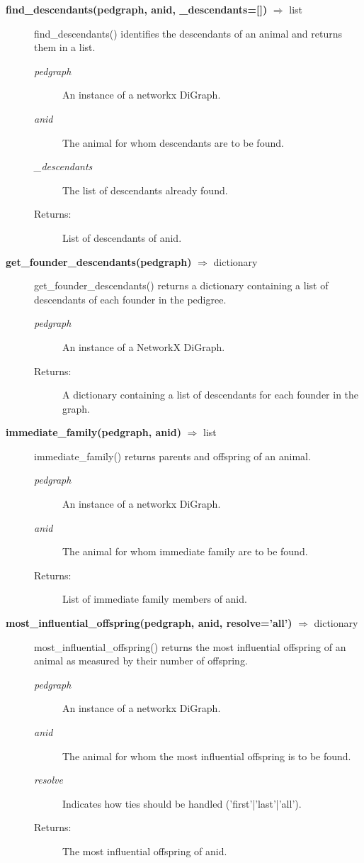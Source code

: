 \begin{description}
\item[\textbf{find\_descendants(pedgraph, anid, \_descendants=[])} $\Rightarrow$ list]
find\_descendants() identifies the descendants of an animal and returns them in a list.
\begin{description}
\item[\emph{pedgraph}] An instance of a networkx DiGraph.
\item[\emph{anid}] The animal for whom descendants are to be found.
\item[\emph{\_descendants}] The list of descendants already found.
\item[Returns:] List of descendants of anid.
\end{description}

\item[\textbf{get\_founder\_descendants(pedgraph)} $\Rightarrow$ dictionary]
get\_founder\_descendants() returns a dictionary containing a list of descendants of each founder in the pedigree.
\begin{description}
\item[\emph{pedgraph}] An instance of a NetworkX DiGraph.
\item[Returns:] A dictionary containing a list of descendants for each founder in the graph.
\end{description}

\item[\textbf{immediate\_family(pedgraph, anid)} $\Rightarrow$ list]
immediate\_family() returns parents and offspring of an animal.
\begin{description}
\item[\emph{pedgraph}] An instance of a networkx DiGraph.
\item[\emph{anid}] The animal for whom immediate family are to be found.
\item[Returns:] List of immediate family members of anid.
\end{description}

\item[\textbf{most\_influential\_offspring(pedgraph, anid, resolve='all')} $\Rightarrow$ dictionary]
most\_influential\_offspring() returns the most influential offspring of an animal as measured by their number of offspring.
\begin{description}
\item[\emph{pedgraph}] An instance of a networkx DiGraph.
\item[\emph{anid}] The animal for whom the most influential offspring is to be found.
\item[\emph{resolve}] Indicates how ties should be handled ('first'|'last'|'all').
\item[Returns:] The most influential offspring of anid.
\end{description}


\end{description}

